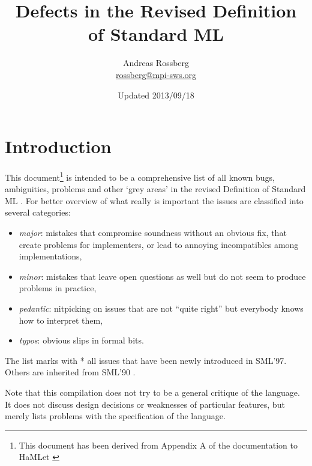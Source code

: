 \documentclass{article}
\begin{document}

\title{Defects in the Revised Definition of Standard ML}

\author{
Andreas Rossberg \\
\url{rossberg@mpi-sws.org}
}

\date{Updated 2013/09/18}

\maketitle


\section{Introduction}

This document\footnote{This document has been derived from Appendix A of the documentation to HaMLet \cite{hamlet}} is intended to be a comprehensive list of all known bugs, ambiguities, problems and other `grey areas' in the revised Definition of Standard ML \cite{definition}. For better overview of what really is important the issues are classified into several categories:

\begin{itemize}
\item {\em major}: mistakes that compromise soundness without an obvious fix, that create problems for implementers, or lead to annoying incompatibles among implementations,
\item {\em minor}: mistakes that leave open questions as well but do not seem to produce problems in practice,
\item {\em pedantic}: nitpicking on issues that are not ``quite right'' but everybody knows how to interpret them,
\item {\em typos}: obvious slips in formal bits.
\end{itemize}

The list marks with * all issues that have been newly introduced in SML'97. Others are inherited from SML'90 \cite{definition90}.

Note that this compilation does not try to be a general critique of the language. It does not discuss design decisions or weaknesses of particular features, but merely lists problems with the specification of the language.
\end{document}
